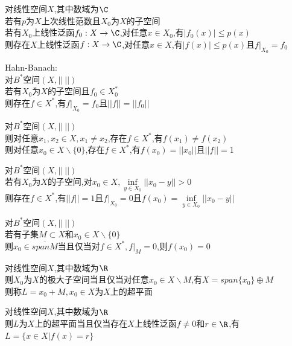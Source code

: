 \begin{dingli}
对线性空间$X$,其中数域为$\C$\\
若有$p$为$X$上次线性范数且$X_0$为$X$的子空间\\
若有$X_0$上线性泛函$f_0:X\to \C$,对任意$x\in X_0$,有$|f_0(x)|\leq p(x)$\\
则存在$X$上线性泛函$f:X\to \C$,对任意$x\in X$,有$|f(x)|\leq p(x)$且$f|_{X_0}=f_{0}$
\end{dingli}

\begin{dingli}
Hahn-Banach:\\
对$B^*$空间$(X,||\ ||)$\\
若有$X_0$为$X$的子空间且$f_0\in X_0^{*}$\\
则存在$f\in X^{*}$,有$f|_{X_0}=f_{0}$且$||f||=||f_{0}||$
\end{dingli}

\begin{dingli}
对$B^*$空间$(X,||\ ||)$\\
则对任意$x_1,x_2\in X, x_1\neq x_2$,存在$f\in X^{*}$,有$f(x_1)\neq f(x_2)$\\
则对任意$x_0\in X\backslash\{0\}$,存在$f\in X^{*}$,有$f(x_0)=||x_0||$且$||f||=1$
\end{dingli}

\begin{dingli}
对$B^*$空间$(X,||\ ||)$\\
若有$X_0$为$X$的子空间,对$x_0\in X,\inf\limits_{y\in X_0}||x_0-y||>0$\\
则存在$f\in X^{*}$,有$||f||=1$且$f|_{X_0}=0$且$f(x_0)=\inf\limits_{y\in X_0}||x_0-y||$
\end{dingli}

\begin{dingli}
对$B^*$空间$(X,||\ ||)$\\
若有子集$M\subset X$和$x_0\in X\backslash\{0\}$\\
则$x_0\in \overline{span M}$当且仅当对$f\in X^{*},f|_{M}=0$,则$f(x_0)=0$
\end{dingli}

\begin{dingyi}
对线性空间$X$,其中数域为$\R$\\
则$X_0$为$X$的极大子空间当且仅当对任意$x_0\in X\backslash M$,有$X=span\{x_0\}\oplus M$\\
则称$L=x_0+M,x_0\in X$为$X$上的超平面
\end{dingyi}

\begin{dingli}
对线性空间$X$,其中数域为$\R$\\
则$L$为$X$上的超平面当且仅当存在$X$上线性泛函$f\neq 0$和$r\in\R$,有$L=\{x\in X|f(x)=r\}$
\end{dingli}

